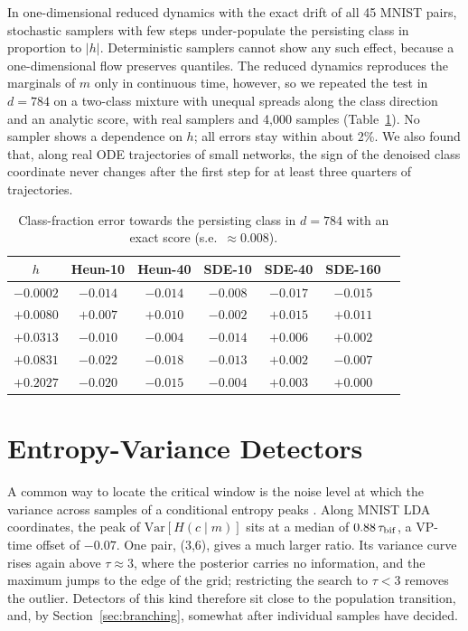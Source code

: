 In one-dimensional reduced dynamics with the exact drift of all 45 MNIST pairs, stochastic samplers with few steps under-populate the persisting class in proportion to $|h|$. Deterministic samplers cannot show any such effect, because a one-dimensional flow preserves quantiles. The reduced dynamics reproduces the marginals of $m$ only in continuous time, however, so we repeated the test in $d=784$ on a two-class mixture with unequal spreads along the class direction and an analytic score, with real samplers and 4{,}000 samples (Table~\ref{tab:fulldim}). No sampler shows a dependence on $h$; all errors stay within about 2\%. We also found that, along real ODE trajectories of small networks, the sign of the denoised class coordinate never changes after the first step for at least three quarters of trajectories.

\begin{table}[h]
\centering
\caption{Class-fraction error towards the persisting class in $d=784$ with an exact score (s.e.\ $\approx0.008$).}
\label{tab:fulldim}
\small
\begin{tabular}{ccccccc}
\toprule
$h$ & Heun-10 & Heun-40 & SDE-10 & SDE-40 & SDE-160 \\
\midrule
$-0.0002$ & $-0.014$ & $-0.014$ & $-0.008$ & $-0.017$ & $-0.015$ \\
$+0.0080$ & $+0.007$ & $+0.010$ & $-0.002$ & $+0.015$ & $+0.011$ \\
$+0.0313$ & $-0.010$ & $-0.004$ & $-0.014$ & $+0.006$ & $+0.002$ \\
$+0.0831$ & $-0.022$ & $-0.018$ & $-0.013$ & $+0.002$ & $-0.007$ \\
$+0.2027$ & $-0.020$ & $-0.015$ & $-0.004$ & $+0.003$ & $+0.000$ \\
\bottomrule
\end{tabular}
\end{table}

\section{Entropy-Variance Detectors}
\label{app:detector}

A common way to locate the critical window is the noise level at which the variance across samples of a conditional entropy peaks \citep{stancevic2026information}. Along MNIST LDA coordinates, the peak of $\mathrm{Var}[H(c\mid m)]$ sits at a median of $0.88\,\tau_{\rm bif}$, a VP-time offset of $-0.07$. One pair, (3,6), gives a much larger ratio. Its variance curve rises again above $\tau\approx3$, where the posterior carries no information, and the maximum jumps to the edge of the grid; restricting the search to $\tau<3$ removes the outlier. Detectors of this kind therefore sit close to the population transition, and, by Section~\ref{sec:branching}, somewhat after individual samples have decided.

